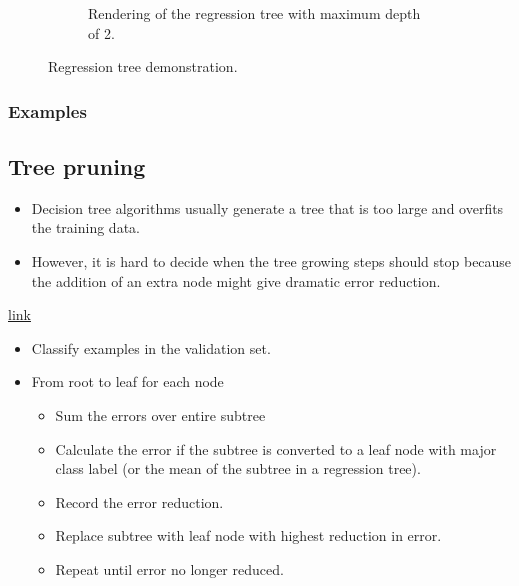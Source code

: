 \begin{refsection}
\begin{figure}[H]
\begin{subfigure}[t]{0.45\textwidth}
	\caption{Rendering of the regression tree with maximum depth of 2.}
\end{subfigure}
\caption{Regression tree demonstration.}
	\label{fig:decisiontreeregressionexample}
\end{figure}

\subsubsection{Examples}


\subsection{Tree pruning}

\begin{remark}\hfill
\begin{itemize}
	\item Decision tree algorithms usually generate a tree that is too large and overfits the training data.
	\item However, it is hard to decide when the tree growing steps should stop because the addition of an extra node might give dramatic error reduction.
\end{itemize}	
	
\end{remark}

\href{http://faculty.cs.tamu.edu/ioerger/cs633-spr10/pruning.ppt}{link}

\begin{method}
\begin{itemize}
	\item Classify examples in the validation set.
	\item From root to leaf for each node
	\begin{itemize}
		\item Sum the errors over entire subtree
		\item Calculate the error if the subtree is converted to a leaf node with major class label (or the mean of the subtree in a regression tree).
		\item Record the error reduction.
	 \item Replace subtree with leaf node with highest reduction in error.
	 \item Repeat until error no longer reduced.
	\end{itemize}
\end{itemize}	
\end{method}





\end{refsection}
